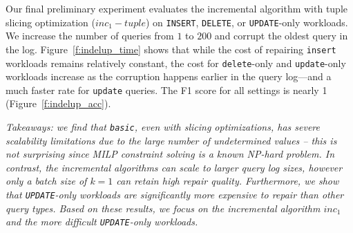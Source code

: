 \label{sec:indelup}
Our final preliminary experiment evaluates the incremental algorithm with tuple slicing optimization 
($inc_1-tuple$) on \texttt{INSERT}, \texttt{DELETE}, or \texttt{UPDATE}-only workloads.
We increase the number of queries from $1$ to $200$ and corrupt the oldest query in the log.  
Figure~\ref{f:indelup_time} shows that while the cost of repairing \texttt{insert} workloads
remains relatively constant, the cost for \texttt{delete}-only and \texttt{update}-only workloads increase as 
the corruption happens earlier in the query log---and a much faster rate for \texttt{update} queries.
The F1 score for all settings is nearly 1 (Figure~\ref{f:indelup_acc}).


{\it Takeaways: we find that \texttt{basic}, even with slicing optimizations,
has severe scalability limitations due to the large number of undetermined values -- this is not surprising
since MILP constraint solving is a known NP-hard problem.
In contrast, the incremental algorithms can scale to larger query log sizes, however only a batch size of $k=1$ can retain high repair quality.
Furthermore, we show that \texttt{UPDATE}-only workloads are significantly more expensive to repair than other query types. 
Based on these results, we focus on the incremental algorithm $inc_1$ and the more difficult \texttt{UPDATE}-only workloads.
}

